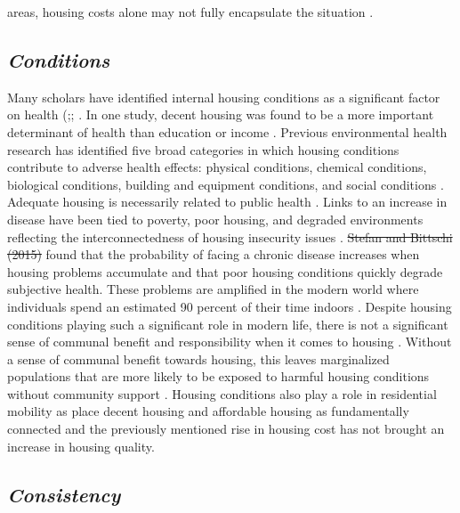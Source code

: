 areas, housing costs alone may not fully encapsulate the situation \citep{kropczynski_insights_2012}. 

\subsection{\textit{Conditions}}

Many scholars have identified internal housing conditions as a significant factor on health (\citealp{braveman_housing_2011};\citealp{metzger_fair_2017}; \citealp{swope_housing_2020}. In one study, decent housing was found to be a more important determinant of health than education or income \citep{angel_housing_2014}. Previous environmental health research has identified five broad categories in which housing conditions contribute to adverse health effects: physical conditions, chemical conditions, biological conditions, building and equipment conditions, and social conditions \citep{jacobs_environmental_2011}. Adequate housing is necessarily related to public health \citep{matte_housing_2000}. Links to an increase in disease have been tied to poverty, poor housing, and degraded environments reflecting the interconnectedness of housing insecurity issues \citep{rauh_housing_2008}. \sout{Stefan and Bittschi (2015)} found that the probability of facing a chronic disease increases when housing problems accumulate and that poor housing conditions quickly degrade subjective health. These problems are amplified in the modern world where individuals spend an estimated 90 percent of their time indoors \citep{palacios_impact_2021}. Despite housing conditions playing such a significant role in modern life, there is not a significant sense of communal benefit and responsibility when it comes to housing \citep{jacobs_environmental_2011}.  Without a sense of communal benefit towards housing, this leaves marginalized populations that are more likely to be exposed to harmful housing conditions without community support \citep{swope_housing_2020}. Housing conditions also play a role in residential mobility as \citet{desmond_housing_2015} place decent housing and affordable housing as fundamentally connected and the previously mentioned rise in housing cost has not brought an increase in housing quality.  

\subsection{\textit{Consistency}} 


